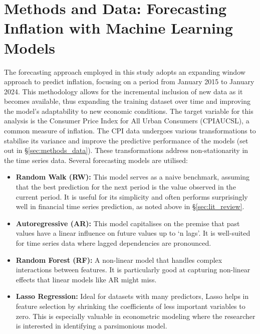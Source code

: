 \section{Methods and Data: Forecasting Inflation with Machine Learning Models} \label{sec:methods}

The forecasting approach employed in this study adopts an expanding window approach to predict inflation, focusing on a period from January 2015 to January 2024. This methodology allows for the incremental inclusion of new data as it becomes available, thus expanding the training dataset over time and improving the model's adaptability to new economic conditions. The target variable for this analysis is the Consumer Price Index for All Urban Consumers (CPIAUCSL), a common measure of inflation. The CPI data undergoes various transformations to stabilise its variance and improve the predictive performance of the models (set out in \S \ref{sec:methods_data}). These transformations address non-stationarity in the time series data. Several forecasting models are utilised:

\begin{itemize}
    \item \textbf{Random Walk (RW):} This model serves as a naive benchmark, assuming that the best prediction for the next period is the value observed in the current period. It is useful for its simplicity and often performs surprisingly well in financial time series prediction, as noted above in \S \ref{sec:lit_review}.
    \item \textbf{Autoregressive (AR):} This model capitalises on the premise that past values have a linear influence on future values up to `n lags'. It is well-suited for time series data where lagged dependencies are pronounced.
    \item \textbf{Random Forest (RF):} A non-linear model that handles complex interactions between features. It is particularly good at capturing non-linear effects that linear models like AR might miss.
    \item \textbf{Lasso Regression:} Ideal for datasets with many predictors, Lasso helps in feature selection by shrinking the coefficients of less important variables to zero. This is especially valuable in econometric modeling where the researcher is interested in identifying a parsimonious model.
\end{itemize}


